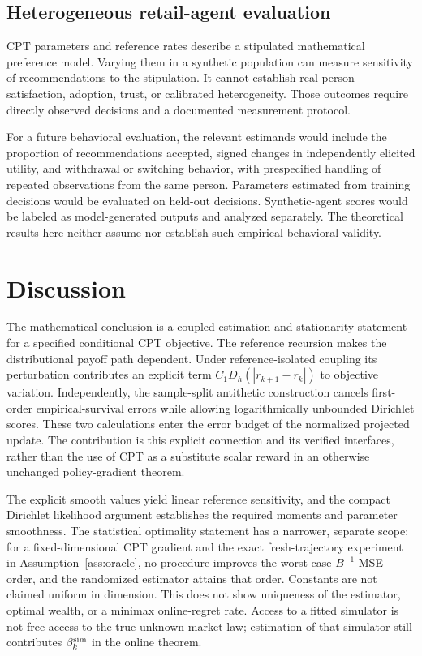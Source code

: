 \documentclass[11pt]{article}
\newcommand{\1}{\mathbf 1}
\theoremstyle{definition}
\begin{document}
\subsection{Heterogeneous retail-agent evaluation}
CPT parameters and reference rates describe a stipulated mathematical preference model. Varying them in a synthetic population can measure sensitivity of recommendations to the stipulation. It cannot establish real-person satisfaction, adoption, trust, or calibrated heterogeneity. Those outcomes require directly observed decisions and a documented measurement protocol.

For a future behavioral evaluation, the relevant estimands would include the proportion of recommendations accepted, signed changes in independently elicited utility, and withdrawal or switching behavior, with prespecified handling of repeated observations from the same person. Parameters estimated from training decisions would be evaluated on held-out decisions. Synthetic-agent scores would be labeled as model-generated outputs and analyzed separately. The theoretical results here neither assume nor establish such empirical behavioral validity.

\section{Discussion}\label{sec:discussion}
The mathematical conclusion is a coupled estimation-and-stationarity statement for a specified conditional CPT objective. The reference recursion makes the distributional payoff path dependent. Under reference-isolated coupling its perturbation contributes an explicit term $C_1D_h(|r_{k+1}-r_k|)$ to objective variation. Independently, the sample-split antithetic construction cancels first-order empirical-survival errors while allowing logarithmically unbounded Dirichlet scores. These two calculations enter the error budget of the normalized projected update. The contribution is this explicit connection and its verified interfaces, rather than the use of CPT as a substitute scalar reward in an otherwise unchanged policy-gradient theorem.

The explicit smooth values yield linear reference sensitivity, and the compact Dirichlet likelihood argument establishes the required moments and parameter smoothness. The statistical optimality statement has a narrower, separate scope: for a fixed-dimensional CPT gradient and the exact fresh-trajectory experiment in Assumption~\ref{ass:oracle}, no procedure improves the worst-case $B^{-1}$ MSE order, and the randomized estimator attains that order. Constants are not claimed uniform in dimension. This does not show uniqueness of the estimator, optimal wealth, or a minimax online-regret rate. Access to a fitted simulator is not free access to the true unknown market law; estimation of that simulator still contributes $\beta_k^{\rm sim}$ in the online theorem.
\end{document}
